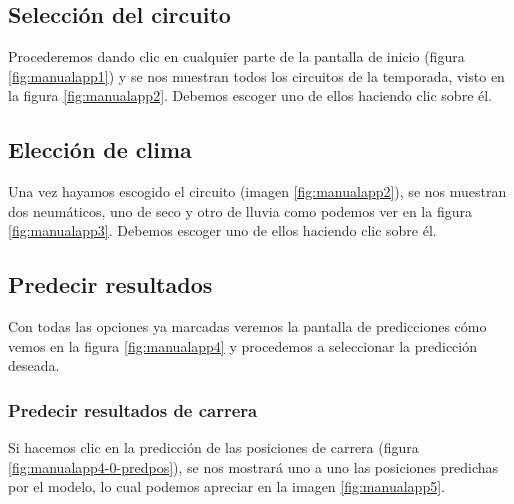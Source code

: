 
\subsection{Selección del circuito}

Procederemos dando clic en cualquier parte de la pantalla de inicio (figura \ref{fig:manualapp1}) y se nos muestran todos los circuitos de la temporada, visto en la figura \ref{fig:manualapp2}. Debemos escoger uno de ellos haciendo clic sobre él.


\subsection{Elección de clima}

Una vez hayamos escogido el circuito (imagen \ref{fig:manualapp2}), se nos muestran dos neumáticos, uno de seco y otro de lluvia como podemos ver en la figura \ref{fig:manualapp3}. Debemos escoger uno de ellos haciendo clic sobre él.


\subsection{Predecir resultados}

Con todas las opciones ya marcadas veremos la pantalla de predicciones cómo vemos en la figura \ref{fig:manualapp4} y procedemos a seleccionar la predicción deseada.



\subsubsection{Predecir resultados de carrera}

Si hacemos clic en la predicción de las posiciones de carrera (figura \ref{fig:manualapp4-0-predpos}), se nos mostrará uno a uno las posiciones predichas por el modelo, lo cual podemos apreciar en la imagen \ref{fig:manualapp5}.



